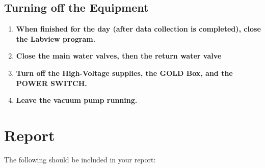 \documentclass{../lab}
\begin{document}
\subsection{Turning off the Equipment}

\begin{enumerate}

    \item \textbf{When finished for the day (after data collection is completed), close the Labview program.}

    \item \textbf{Close the main water valves, then the return water valve}

    \item \textbf{Turn off the High-Voltage supplies, the GOLD Box, and the POWER SWITCH.}

    \item \textbf{Leave the vacuum pump running.}

\end{enumerate}

\section{Report}

The following should be included in your report:
\end{document}
